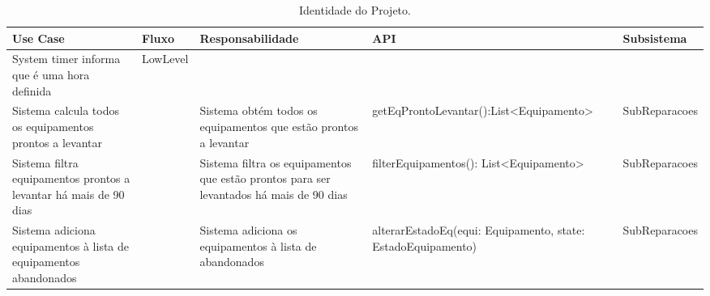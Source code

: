 \documentclass[../relatorio.tex]{subfiles}
\begin{document}
\begin{landscape}
    \begin{table}[!h]
        \centering
        \begin{tabular}{|p{5cm}|p{1cm}|p{4cm}|p{6cm}|p{3cm}|}
            \hline
            \rowcolor{gray!20!white}
            Use Case & Fluxo & Responsabilidade & API & Subsistema \\
            \hline
            \rowcolor{red}
            System timer informa que é uma hora definida
                     & LowLevel
                     &
                     &
                     &
            \\
            \hline
            Sistema calcula todos os equipamentos prontos a levantar 
                     & 
                     & Sistema obtém todos os equipamentos que estão prontos a levantar
                     & getEqProntoLevantar():List<Equipamento>
                     & SubReparacoes
            \\
            \hline
            Sistema filtra equipamentos prontos a levantar há mais de 90 dias
                     &
                     & Sistema filtra os equipamentos que estão prontos para ser levantados há mais de 90 dias
                     & filterEquipamentos(): List<Equipamento>
                     & SubReparacoes
            \\
            \hline
            Sistema adiciona equipamentos à lista de equipamentos abandonados
                     & 
                     & Sistema adiciona os equipamentos à lista de abandonados
                     & alterarEstadoEq(equi: Equipamento, state: EstadoEquipamento)
                     & SubReparacoes
            \\
            \hline
        \end{tabular}
        \caption{Identidade do Projeto.}
    \end{table}
\end{landscape}
\end{document}

